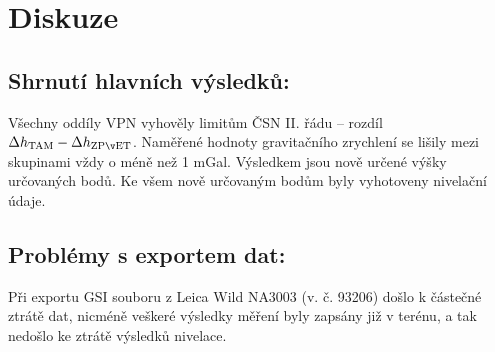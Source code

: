 \section{Diskuze}


\subsection{Shrnutí hlavních výsledků:}
Všechny oddíly VPN vyhověly limitům ČSN II. řádu – rozdíl \(\Delta h_{\rm TAM}-\Delta h_{\rm ZPĚT}\).
Naměřené hodnoty gravitačního zrychlení se lišily mezi skupinami vždy o méně než 1 mGal. Výsledkem jsou nově určené výšky určovaných bodů. Ke všem nově určovaným bodům byly vyhotoveny nivelační údaje.

\subsection{Problémy s exportem dat:}
    Při exportu GSI souboru z Leica Wild NA3003 (v. č. 93206) došlo k částečné ztrátě dat, nicméně veškeré výsledky měření byly zapsány již v terénu, a tak nedošlo ke ztrátě výsledků nivelace.
